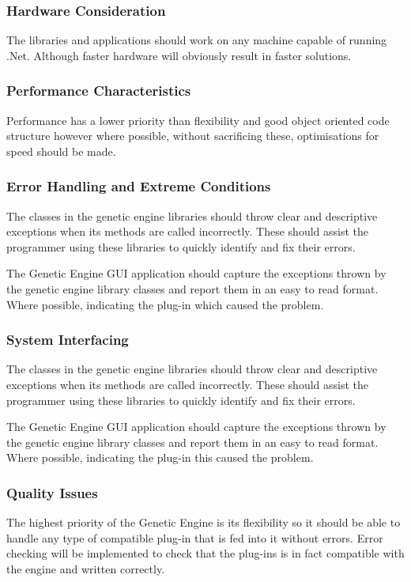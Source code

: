 \subsubsection{Hardware Consideration}
The libraries and applications should work on any machine capable of running .Net. Although faster hardware will obviously result in faster solutions.

\subsubsection{Performance Characteristics}
Performance has a lower priority than flexibility and good object oriented code structure however where possible, without sacrificing these, optimisations for speed should be made.

\subsubsection{Error Handling and Extreme Conditions}
The classes in the genetic engine libraries should throw clear and descriptive exceptions when its methods are called incorrectly. These should assist the programmer using these libraries to quickly identify and fix their errors.

The Genetic Engine GUI application should capture the exceptions thrown by the genetic engine library classes and report them in an easy to read format. Where possible, indicating the plug-in which caused the problem.

\subsubsection{System Interfacing}
The classes in the genetic engine libraries should throw clear and descriptive exceptions when its methods are called incorrectly. These should assist the programmer using these libraries to quickly identify and fix their errors.

The Genetic Engine GUI application should capture the exceptions thrown by the genetic engine library classes and report them in an easy to read format. Where possible, indicating the plug-in this caused the problem.

\subsubsection{Quality Issues}
The highest priority of the Genetic Engine is its flexibility so it should be able to handle any type of compatible plug-in that is fed into it without errors. Error checking will be implemented to check that the plug-ins is in fact compatible with the engine and written correctly.

